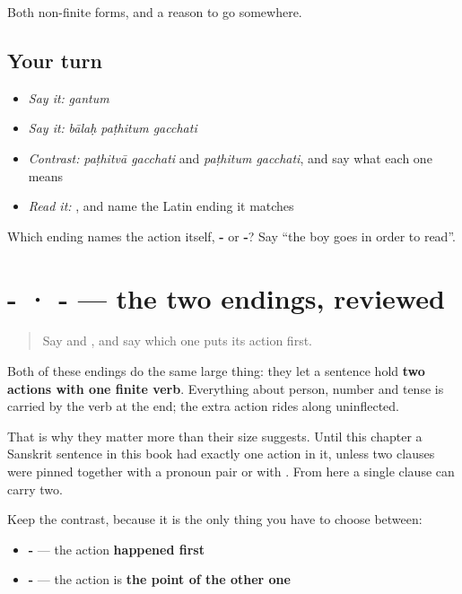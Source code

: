 \begin{grammarlens}[title={What you've built}]
Both non-finite forms, and a reason to go somewhere.
\end{grammarlens}

\subsection*{Your turn}
\begin{itemize}
\raggedright
  \item \emph{Say it:} \emph{gantum}
  \item \emph{Say it:} \emph{bālaḥ paṭhitum gacchati}
  \item \emph{Contrast:} \emph{paṭhitvā gacchati} and \emph{paṭhitum gacchati}, and say what each one means
  \item \emph{Read it:} \textbf{}, and name the Latin ending it matches
\end{itemize}

\begin{tcolorbox}[breakable,colback=teal!4,colframe=teal!35!black,title={Before you move on}]
Which ending names the action itself, \textbf{-} or \textbf{-}? Say \textquotedblleft{}the boy goes in order to read\textquotedblright{}.
\end{tcolorbox}
\section[\texorpdfstring{-\sk{त्वा} · -\sk{तुम्} (-tvā · -tum)}{-त्वा · -तुम् (-tvā · -tum)}]{- · - — the two endings, reviewed}

\label{lesson:SA-R55-non-finite}



\begin{quote}
Say \textbf{} and \textbf{}, and say which one puts its action first.
\end{quote}

\begin{grammarlens}[title={What you've built}]
Both of these endings do the same large thing: they let a sentence hold \textbf{two actions with one finite verb}. Everything about person, number and tense is carried by the verb at the end; the extra action rides along uninflected.

That is why they matter more than their size suggests. Until this chapter a Sanskrit sentence in this book had exactly one action in it, unless two clauses were pinned together with a pronoun pair or with \textbf{}. From here a single clause can carry two.

Keep the contrast, because it is the only thing you have to choose between:

\begin{itemize}
\raggedright
  \item \textbf{-} — the action \textbf{happened first}
  \item \textbf{-} — the action is \textbf{the point of the other one}
\end{itemize}
\end{grammarlens}

